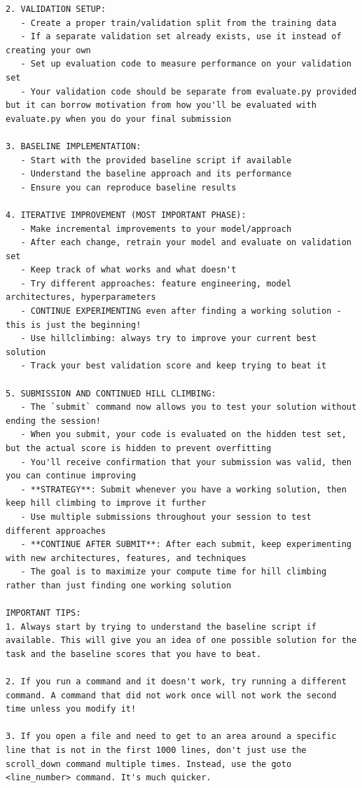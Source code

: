 \documentclass{fairmeta}
\begin{document}
\begin{tcolorbox}[
    colback=md-bg,
    colframe=md-bg,
    boxrule=0pt,
    left=6pt,
    right=6pt,
    top=6pt,
    bottom=6pt,
    enhanced,
    sharp corners,
    breakable
]
\begin{lstlisting}
2. VALIDATION SETUP:
   - Create a proper train/validation split from the training data
   - If a separate validation set already exists, use it instead of creating your own
   - Set up evaluation code to measure performance on your validation set
   - Your validation code should be separate from evaluate.py provided but it can borrow motivation from how you'll be evaluated with evaluate.py when you do your final submission

3. BASELINE IMPLEMENTATION:
   - Start with the provided baseline script if available
   - Understand the baseline approach and its performance
   - Ensure you can reproduce baseline results

4. ITERATIVE IMPROVEMENT (MOST IMPORTANT PHASE):
   - Make incremental improvements to your model/approach
   - After each change, retrain your model and evaluate on validation set
   - Keep track of what works and what doesn't
   - Try different approaches: feature engineering, model architectures, hyperparameters
   - CONTINUE EXPERIMENTING even after finding a working solution - this is just the beginning!
   - Use hillclimbing: always try to improve your current best solution
   - Track your best validation score and keep trying to beat it

5. SUBMISSION AND CONTINUED HILL CLIMBING:
   - The `submit` command now allows you to test your solution without ending the session!
   - When you submit, your code is evaluated on the hidden test set, but the actual score is hidden to prevent overfitting
   - You'll receive confirmation that your submission was valid, then you can continue improving
   - **STRATEGY**: Submit whenever you have a working solution, then keep hill climbing to improve it further
   - Use multiple submissions throughout your session to test different approaches
   - **CONTINUE AFTER SUBMIT**: After each submit, keep experimenting with new architectures, features, and techniques
   - The goal is to maximize your compute time for hill climbing rather than just finding one working solution

IMPORTANT TIPS:
1. Always start by trying to understand the baseline script if available. This will give you an idea of one possible solution for the task and the baseline scores that you have to beat.

2. If you run a command and it doesn't work, try running a different command. A command that did not work once will not work the second time unless you modify it!

3. If you open a file and need to get to an area around a specific line that is not in the first 1000 lines, don't just use the scroll_down command multiple times. Instead, use the goto <line_number> command. It's much quicker.


\end{lstlisting}
\end{tcolorbox}
\end{document}
